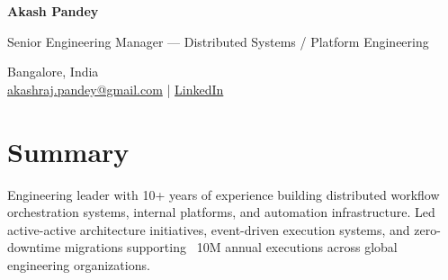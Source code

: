 \begin{center}
    {\LARGE \textbf{Akash Pandey}} \\

    \vspace{4pt}

    Senior Engineering Manager — Distributed Systems / Platform Engineering \\

    \vspace{4pt}

    Bangalore, India \\
    \href{mailto:akashraj.pandey@gmail.com}{akashraj.pandey@gmail.com} |
    \href{https://linkedin.com/in/akashrajp}{LinkedIn}
\end{center}

\vspace{8pt}

\section*{Summary}

Engineering leader with 10+ years of experience building distributed workflow orchestration systems, internal platforms, and automation infrastructure. Led active-active architecture initiatives, event-driven execution systems, and zero-downtime migrations supporting ~10M annual executions across global engineering organizations.

